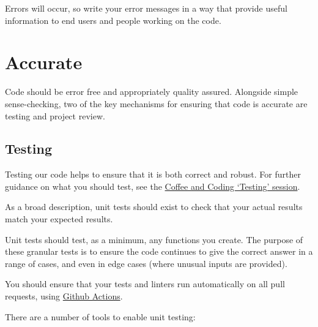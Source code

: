 \documentclass[]{book}
\begin{document}
Errors will occur, so write your error messages in a way that provide useful information to end users and people working on the code.

\hypertarget{accurate}{%
\chapter{Accurate}\label{accurate}}

Code should be error free and appropriately quality assured. Alongside simple sense-checking, two of the key mechanisms for ensuring that code is accurate are testing and project review.

\hypertarget{unittest}{%
\section{Testing}\label{unittest}}

Testing our code helps to ensure that it is both correct and robust. For further guidance on what you should test, see the \href{https://github.com/moj-analytical-services/coffee-and-coding-public/tree/master/2019-12-06\%20Testing\%20as\%20part\%20of\%20an\%20Analytical\%20Project}{Coffee and Coding `Testing' session}.

As a broad description, unit tests should exist to check that your actual results match your expected results.

Unit tests should test, as a minimum, any functions you create. The purpose of these granular tests is to ensure the code continues to give the correct answer in a range of cases, and even in edge cases (where unusual inputs are provided).

You should ensure that your tests and linters run automatically on all pull requests, using \href{https://help.github.com/en/actions/automating-your-workflow-with-github-actions}{Github Actions}.

There are a number of tools to enable unit testing:
\end{document}
